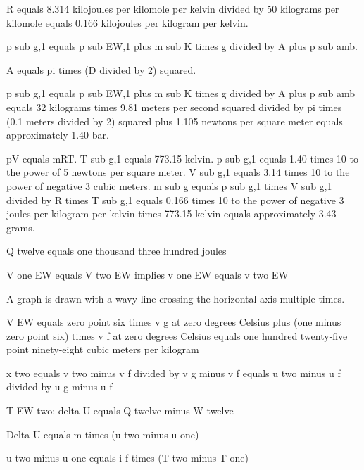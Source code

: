 R equals 8.314 kilojoules per kilomole per kelvin divided by 50 kilograms per kilomole equals 0.166 kilojoules per kilogram per kelvin.  

p sub g,1 equals p sub EW,1 plus m sub K times g divided by A plus p sub amb.  

A equals pi times (D divided by 2) squared.  

p sub g,1 equals p sub EW,1 plus m sub K times g divided by A plus p sub amb equals 32 kilograms times 9.81 meters per second squared divided by pi times (0.1 meters divided by 2) squared plus 1.105 newtons per square meter equals approximately 1.40 bar.  

pV equals mRT.  
T sub g,1 equals 773.15 kelvin.  
p sub g,1 equals 1.40 times 10 to the power of 5 newtons per square meter.  
V sub g,1 equals 3.14 times 10 to the power of negative 3 cubic meters.  
m sub g equals p sub g,1 times V sub g,1 divided by R times T sub g,1 equals 0.166 times 10 to the power of negative 3 joules per kilogram per kelvin times 773.15 kelvin equals approximately 3.43 grams.

Q twelve equals one thousand three hundred joules  

V one EW equals V two EW implies v one EW equals v two EW  

A graph is drawn with a wavy line crossing the horizontal axis multiple times.  

V EW equals zero point six times v g at zero degrees Celsius plus (one minus zero point six) times v f at zero degrees Celsius equals one hundred twenty-five point ninety-eight cubic meters per kilogram  

x two equals v two minus v f divided by v g minus v f equals u two minus u f divided by u g minus u f  

T EW two: delta U equals Q twelve minus W twelve  

Delta U equals m times (u two minus u one)  

u two minus u one equals i f times (T two minus T one)